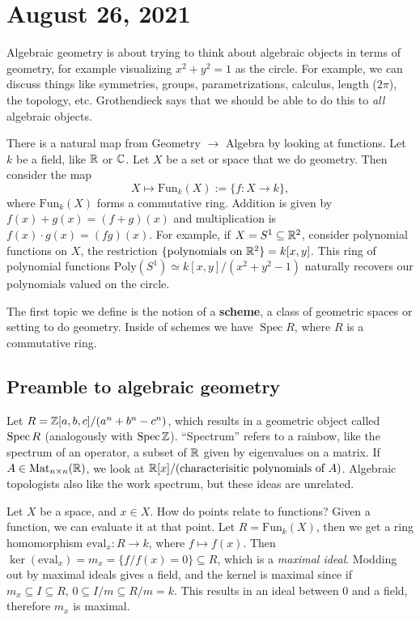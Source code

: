 \section{August 26, 2021}
Algebraic geometry is about trying to think about algebraic objects in terms of geometry, for example visualizing $x^2+y^2=1$ as the circle. For example, we can discuss things like symmetries, groups, parametrizations, calculus, length ($2\pi$), the topology, etc. Grothendieck says that we should be able to do this to \emph{all} algebraic objects.

There is a natural map from Geometry  $\to $ Algebra by looking at functions. Let $k$ be a field, like $\mathbb{R}$ or $\mathbb{C}$. Let $X$ be a set or space that we do geometry. Then consider the map\[
    X\mapsto \mathrm{Fun}_k(X):= \{f \colon X \to k\} ,
\] where $\mathrm{Fun}_k(X)$ forms a commutative ring. Addition is given by $f(x)+g(x)=(f +g)(x)$ and multiplication is $f(x) \cdot g(x)=(fg)(x)$. For example, if $X =S^1  \subseteq \mathbb{R}^2$, consider polynomial functions on $X$, the restriction $\{ \text{polynomials on} \ \R^2\} =k[x,y]$. This ring of polynomial functions $\mathrm{Poly}(S^1 )\simeq k[x,y] / (x^2+y^2-1) $ naturally recovers our polynomials valued on the circle.

The first topic we define is the notion of a \textbf{scheme}, a class of geometric spaces or setting to do geometry. Inside of schemes we have $\operatorname{Spec}R$, where $R$ is a commutative ring.

\subsection{Preamble to algebraic geometry}
Let $R= \mathbb{Z}[a,b,c] / (a^n +b^n -c^n )$, which results in a geometric object called $\operatorname{Spec} R$ (analogously with $\operatorname{Spec} \mathbb{Z}$). ``Spectrum'' refers to a rainbow, like the spectrum of an operator, a subset of $\mathbb{R}$ given by eigenvalues on a matrix. If $A \in \mathrm{Mat}_{n \times n}(\mathbb{R})$, we look at $\mathbb{R}[x] / ( \text{characterisitic polynomials of} \ A)$. Algebraic topologists also like the work spectrum, but these ideas are unrelated.

Let $X$ be a space, and $x \in X$. How do points relate to functions? Given a function, we can evaluate it at that point. Let $R= \mathrm{Fun}_k(X)$, then we get a ring homomorphism $\mathrm{eval}_x \colon R \to k$, where $f \mapsto f(x)$. Then $\ker( \mathrm{eval}_x)=m_x=\{f / f(x)=0\} \subseteq R$, which is a \emph{maximal ideal}. Modding out by maximal ideals gives a field, and the kernel is maximal since if $m_x \subseteq I \subseteq R$, $0 \subseteq I /m \subseteq R /m=k$. This results in an ideal between 0 and a field, therefore $m_x$ is maximal.

